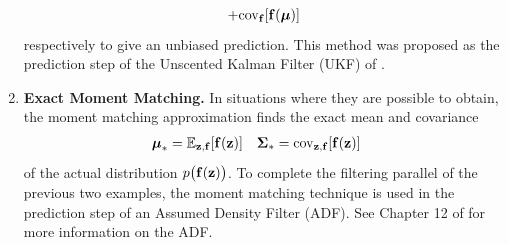 \begin{enumerate}
\begin{align*}
+ \mathrm{cov}_{\mathbf{f}}[\mathbf{f}(\boldsymbol{\mu})]
\end{align*}
respectively to give an unbiased prediction. This method was proposed as the prediction step of the Unscented Kalman Filter (UKF) of \cite{JU97}.
%
\item {\bf Exact Moment Matching.} In situations where they are possible to obtain, the moment matching approximation finds the exact mean and covariance 
\begin{align*}
\boldsymbol{\mu}_* &= \mathbb{E}_{\mathbf{z},\mathbf{f}}[\mathbf{f}(\mathbf{z})]
& \boldsymbol{\Sigma}_* &= \mathrm{cov}_{\mathbf{z},\mathbf{f}}[\mathbf{f}(\mathbf{z})]
\end{align*}
of the actual distribution $p\big(\mathbf{f}(\mathbf{z})\big)$. To complete the filtering parallel of the previous two examples, the moment matching technique is used in the prediction step of an Assumed Density Filter (ADF). See Chapter 12 of \cite{May82} for more information on the ADF.
\end{enumerate}


